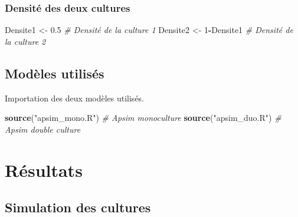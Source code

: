 \documentclass[
]{article}
\newenvironment{Shaded}{\begin{snugshade}}{\end{snugshade}}
\newcommand{\CommentTok}[1]{\textcolor[rgb]{0.56,0.35,0.01}{\textit{#1}}}
\newcommand{\DecValTok}[1]{\textcolor[rgb]{0.00,0.00,0.81}{#1}}
\newcommand{\FloatTok}[1]{\textcolor[rgb]{0.00,0.00,0.81}{#1}}
\newcommand{\FunctionTok}[1]{\textcolor[rgb]{0.13,0.29,0.53}{\textbf{#1}}}
\newcommand{\NormalTok}[1]{#1}
\newcommand{\OtherTok}[1]{\textcolor[rgb]{0.56,0.35,0.01}{#1}}
\newcommand{\SpecialCharTok}[1]{\textcolor[rgb]{0.81,0.36,0.00}{\textbf{#1}}}
\newcommand{\StringTok}[1]{\textcolor[rgb]{0.31,0.60,0.02}{#1}}
\begin{document}
\subsubsection{Densité des deux
cultures}\label{densituxe9-des-deux-cultures}

\begin{Shaded}
\begin{Highlighting}[]
\NormalTok{Densite1 }\OtherTok{\textless{}{-}} \FloatTok{0.5} \CommentTok{\# Densité de la culture 1 }
\NormalTok{Densite2 }\OtherTok{\textless{}{-}} \DecValTok{1}\SpecialCharTok{{-}}\NormalTok{Densite1 }\CommentTok{\# Densité de la culture 2 }
\end{Highlighting}
\end{Shaded}

\subsection{Modèles utilisés}\label{moduxe8les-utilisuxe9s}

Importation des deux modèles utilisés.

\begin{Shaded}
\begin{Highlighting}[]
\FunctionTok{source}\NormalTok{(}\StringTok{"apsim\_mono.R"}\NormalTok{)  }\CommentTok{\# Apsim monoculture}
\FunctionTok{source}\NormalTok{(}\StringTok{"apsim\_duo.R"}\NormalTok{)   }\CommentTok{\# Apsim double culture}
\end{Highlighting}
\end{Shaded}

\section{Résultats}\label{ruxe9sultats}

\subsection{Simulation des cultures}\label{simulation-des-cultures}
\end{document}
